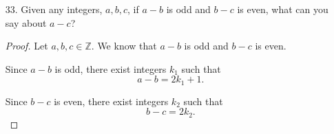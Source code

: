 \documentclass[12pt]{article}
\begin{document}
\begin{enumerate}
\begin{enumerate}
\begin{proof}
                \textbf{Case 2: Both \(m\) and \(n\) are odd.}
                
                If \(m, n \in \mathbb{Z}\) are odd, then for some \(k_3, k_4 \in \mathbb{Z}\),
                \[ m = 2k_3 + 1 \quad \text{and} \quad n = 2k_4 + 1. \]
                
                Then,
                \[ m+n = (2k_3 + 1) + (2k_4 + 1) = 2k_3 + 2k_4 + 2 = 2(k_3 + k_4 + 1), \]
                which is even, and
                \[ m-n = (2k_3 + 1) - (2k_4 + 1) = 2k_3 - 2k_4 = 2(k_3 - k_4), \]
                which is also even. As \((k_3 + k_4 + 1) \in \mathbb{Z}\) and \((k_3 - k_4) \in \mathbb{Z}\) since integers are closed under addition and subtraction, both \(m+n\) and \(m-n\) are even.
                
                \textbf{Case 3: One of \(m\) or \(n\) is even, and the other is odd.}
                
                Assume \(m\) is even and \(n\) is odd without loss of generality. Then, for some \(k_5, k_6 \in \mathbb{Z}\),
                \[ m = 2k_5 \quad \text{and} \quad n = 2k_6 + 1. \]
                
                Then,
                \[ m+n = 2k_5 + (2k_6 + 1) = 2k_5 + 2k_6 + 1 = 2(k_5 + k_6) + 1, \]
                which is odd, and
                \[ m-n = 2k_5 - (2k_6 + 1) = 2k_5 - 2k_6 - 1 = 2(k_5 - k_6) - 1, \]
                which is also odd. As \((k_5 + k_6) \in \mathbb{Z}\) and \((k_5 - k_6) \in \mathbb{Z}\) since integers are closed under addition and subtraction, both \(m+n\) and \(m-n\) are odd.
                
                Thus, for all integers \(m\) and \(n\), \(m+n\) and \(m-n\) are either both odd or both even.
                \end{proof}
                
            \item[33.]Given any integers, $a,b,c$, if $a-b$ is odd and $b-c$ is even, what can you say about $a-c$?
                \begin{proof}
                Let \(a, b, c \in \mathbb{Z}\). We know that \(a-b\) is odd and \(b-c\) is even.
                
                Since \(a-b\) is odd, there exist integers \(k_1\) such that
                \[ a - b = 2k_1 + 1. \]
                
                Since \(b-c\) is even, there exist integers \(k_2\) such that
                \[ b - c = 2k_2. \]
                

\end{proof}
\end{enumerate}
\end{enumerate}
\end{document}
